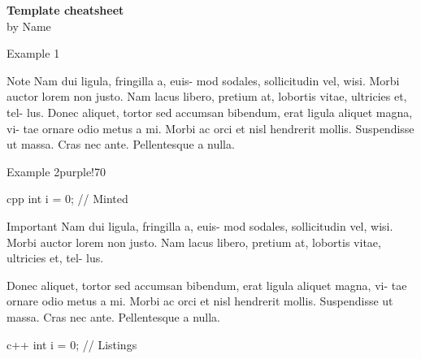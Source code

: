 \documentclass[10pt, a4paper, landscape]{article}
\begin{document}
	
\begin{onehalfspace}
	
	\begin{multicols*}{4}
	
		\begin{flushleft}
			\LARGE{\bf{\textcolor{\mainColor}{\textbf{Template cheatsheet}}}} \\
			\large{by \textcolor{\mainColor}{Name}}
		\end{flushleft}
		
		\begin{Text}{Example 1}
			 \lipsum[1]
			
			\begin{Note}{Note}
				Nam dui ligula, fringilla a, euis-
				mod sodales, sollicitudin vel, wisi. Morbi
				auctor lorem non justo. Nam lacus libero,
				pretium at, lobortis vitae, ultricies et, tel-
				lus.
				 Donec aliquet, tortor sed accumsan
				bibendum, erat ligula aliquet magna, vi-
				tae ornare odio metus a mi. Morbi ac
				orci et nisl hendrerit mollis. Suspendisse
				ut massa. Cras nec ante. Pellentesque
				a nulla. 
			
			\end{Note}
		
			\lipsum[3-4]
		\end{Text}
	
		\begin{TextColor}{Example 2}{purple!70}		
			\lipsum[2]
			
\begin{CodeMinted}{cpp}
int i = 0; // Minted
\end{CodeMinted}
			
			\begin{Important}{Important}
				Nam dui ligula, fringilla a, euis-
				mod sodales, sollicitudin vel, wisi. Morbi
				auctor lorem non justo.
				Nam lacus libero,
				pretium at, lobortis vitae, ultricies et, tel-
				lus.
				
				Donec aliquet, tortor sed accumsan
				bibendum, erat ligula aliquet magna, vi-
				tae ornare odio metus a mi.
				Morbi ac
				orci et nisl hendrerit mollis. Suspendisse
				ut massa. Cras nec ante. Pellentesque
				a nulla. 
			\end{Important}
		
\begin{CodeListings}{c++}
int i = 0; // Listings
\end{CodeListings}
			
			\lipsum[3-6]
		\end{TextColor}
		
	\end{multicols*}

\end{onehalfspace}
	
\end{document}
